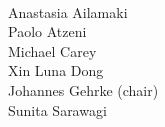 \vspace{0.1in}

\begin{flushright}
 \\
\indent Anastasia Ailamaki\\
\indent Paolo Atzeni\\
\indent Michael Carey \\
\indent Xin Luna Dong \\
\indent Johannes Gehrke (chair) \\
\indent Sunita Sarawagi
\end{flushright}

